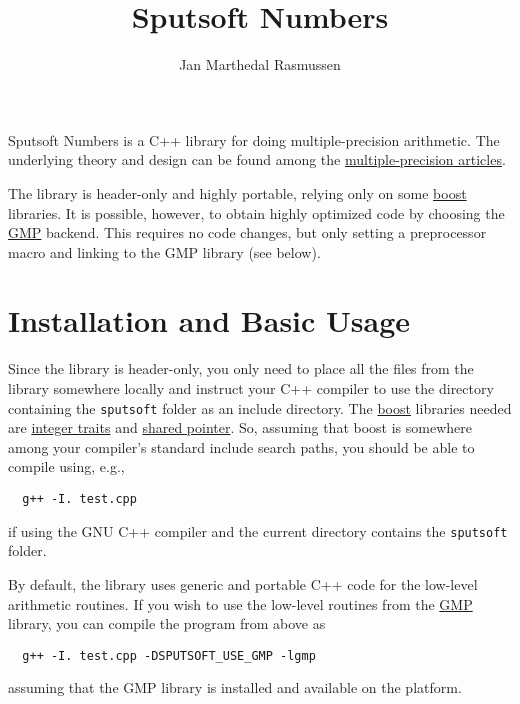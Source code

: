 \documentclass[a4paper]{article}
\begin{document}
\title{Sputsoft Numbers}
\author{Jan Marthedal Rasmussen}

\maketitle


Sputsoft Numbers is a C++ library for doing multiple-precision arithmetic. The underlying theory and design can be found among the \href{http://sputsoft.com/tag/multiple-precision/}{multiple-precision articles}.

The library is header-only and highly portable, relying only on some \href{http://www.boost.org}{boost} libraries. It is possible, however, to obtain highly optimized code by choosing the \href{http://gmplib.org/}{GMP} backend. This requires no code changes, but only setting a preprocessor macro and linking to the GMP library (see below).


\section{Installation and Basic Usage}

Since the library is header-only, you only need to place all the files from the library somewhere locally and instruct your C++ compiler to use the directory containing the \texttt{sputsoft} folder as an include directory. The \href{http://www.boost.org}{boost} libraries needed are \href{http://www.boost.org/doc/libs/1_43_0/libs/integer/doc/html/boost_integer/traits.html}{integer traits} and \href{http://www.boost.org/doc/libs/1_43_0/libs/smart_ptr/shared_ptr.htm}{shared pointer}. So, assuming that boost is somewhere among your compiler's standard include search paths, you should be able to compile using, e.g.,
\begin{verbatim}
  g++ -I. test.cpp
\end{verbatim}
if using the GNU C++ compiler and the current directory contains the \texttt{sputsoft} folder.

By default, the library uses generic and portable C++ code for the low-level arithmetic routines. If you wish to use the low-level routines from the \href{http://gmplib.org}{GMP} library, you can compile the program from above as
\begin{verbatim}
  g++ -I. test.cpp -DSPUTSOFT_USE_GMP -lgmp
\end{verbatim}
assuming that the GMP library is installed and available on the platform.
\end{document}
